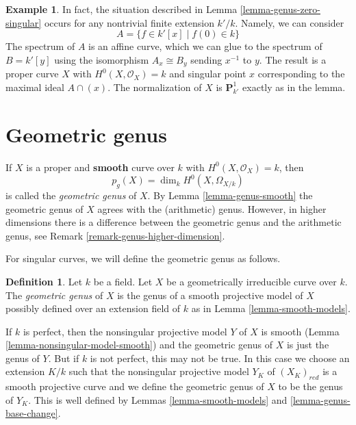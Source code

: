 \documentclass{stacks-project}
\theoremstyle{plain}
\theoremstyle{definition}
\newtheorem{definition}[subsection]{Definition}
\newtheorem{example}[subsection]{Example}
\theoremstyle{remark}
\numberwithin{equation}{subsection}
\begin{document}
\begin{example}
\label{example-squish-on-P1}
In fact, the situation described in Lemma \ref{lemma-genus-zero-singular}
occurs for any nontrivial finite extension $k'/k$. Namely, we can consider
$$
A = \{f \in k'[x] \mid f(0) \in k \}
$$
The spectrum of $A$ is an affine curve, which we can glue to
the spectrum of $B = k'[y]$ using the isomorphism
$A_x \cong B_y$ sending $x^{-1}$ to $y$.
The result is a proper curve $X$ with $H^0(X, \mathcal{O}_X) = k$
and singular point $x$ corresponding to the maximal ideal $A \cap (x)$.
The normalization of $X$ is $\mathbf{P}^1_{k'}$ exactly as in the lemma.
\end{example}








\section{Geometric genus}
\label{section-geometric-genus}

\noindent
If $X$ is a proper and {\bf smooth} curve over $k$ with
$H^0(X, \mathcal{O}_X) = k$, then
$$
p_g(X) = \dim_k H^0(X, \Omega_{X/k})
$$
is called the {\it geometric genus} of $X$. By Lemma \ref{lemma-genus-smooth}
the geometric genus of $X$ agrees with the (arithmetic) genus. However,
in higher dimensions there is a difference between the geometric genus
and the arithmetic genus, see Remark \ref{remark-genus-higher-dimension}.

\medskip\noindent
For singular curves, we will define the geometric genus as follows.

\begin{definition}
\label{definition-geometric-genus}
Let $k$ be a field. Let $X$ be a geometrically irreducible
curve over $k$. The {\it geometric genus} of $X$ is the genus
of a smooth projective model of $X$ possibly defined over
an extension field of $k$ as in
Lemma \ref{lemma-smooth-models}.
\end{definition}

\noindent
If $k$ is perfect, then the nonsingular projective model $Y$ of $X$
is smooth (Lemma \ref{lemma-nonsingular-model-smooth})
and the geometric genus of $X$ is just the genus of $Y$.
But if $k$ is not perfect, this may not be true.
In this case we choose an extension $K/k$ such that
the nonsingular projective model $Y_K$ of $(X_K)_{red}$ is
a smooth projective curve and we define the geometric genus
of $X$ to be the genus of $Y_K$. This is well defined by
Lemmas \ref{lemma-smooth-models} and \ref{lemma-genus-base-change}.
\end{document}
